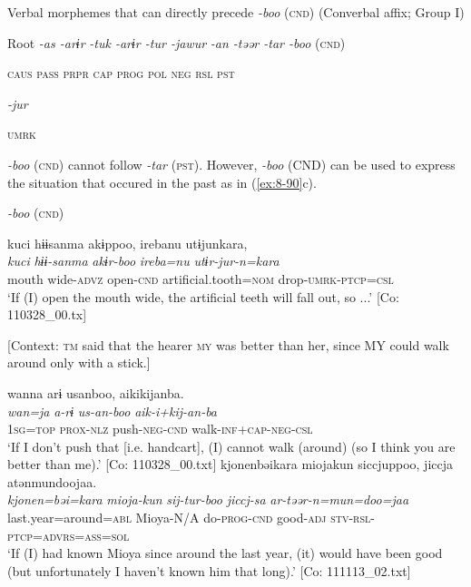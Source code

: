 \ea\label{ex:8-89}
  Verbal morphemes that can directly precede \textit{-boo} (\textsc{cnd}) (Converbal affix; Group I)

  Root  \textit{-as  -arɨr} %
\textit{-tuk  -arɨr  -tur  -jawur} %
\textit{-an  -təər  -tar  -boo} (\textsc{cnd})

    \textsc{caus}  \textsc{pass}  \textsc{prpr}  \textsc{cap}  \textsc{prog}  \textsc{pol}  \textsc{neg}  \textsc{rsl}  \textsc{pst}

          \textit{-jur}

          \textsc{umrk}
\z

\textit{-boo} (\textsc{cnd}) cannot follow \textit{-tar} (\textsc{pst}). However, \textit{-boo} (CND) can be used to express the situation that occured in the past as in (\ref{ex:8-90}c).

\ea\label{ex:8-90}
  \textit{-boo} (\textsc{cnd})

\ea
{\TM}
\glll  kuci  hɨɨsanma  akɨppoo,  {\textbar}ireba{\textbar}nu      utɨjunkara,\\
\textit{kuci}  \textit{hɨɨ-sanma}  \textit{akɨr-boo}  \textit{ireba=nu}      \textit{utɨr-jur-n=kara}\\
mouth  wide-\textsc{advz}  open-\textsc{cnd}  artificial.tooth=\textsc{nom}  drop-\textsc{umrk}-\textsc{ptcp}=\textsc{csl}\\
\glt ‘If (I) open the mouth wide, the artificial teeth will fall out, so ...’ [Co: 110328\_00.tx]


\ex {}[Context: \textsc{tm} said that the hearer \textsc{my} was better than her, since MY could walk around only with a stick.]

{\TM}
\glll  wanna  arɨ  usanboo,  aikikijanba.\\
\textit{wan=ja}  \textit{a-rɨ}  \textit{us-an-boo}  \textit{aik-i+kij-an-ba}\\
1\textsc{sg}=\textsc{top}  \textsc{prox}-\textsc{nlz}  push-\textsc{neg}-\textsc{cnd}  walk-\textsc{inf}+\textsc{cap}-\textsc{neg}-\textsc{csl}\\
\glt ‘If I don’t push that [i.e. handcart], (I) cannot walk (around) (so I think you are better than me).’ [Co: 110328\_00.txt]
\ex
{\TM}
\glll  {\textbar}kjonen{\textbar}bəikara  mioja{\textbar}kun{\textbar}  siccjuppoo,  jiccja      atənmundoojaa.\\
\textit{kjonen=bəi=kara}  \textit{mioja-kun}  \textit{sij-tur-boo}  \textit{jiccj-sa}    \textit{ar-təər-n=mun=doo=jaa}\\
last.year=around=\textsc{abl}  Mioya-N/A  do-\textsc{prog}-\textsc{cnd}  good-\textsc{adj}  \textsc{stv}-\textsc{rsl}-\textsc{ptcp}=\textsc{advrs}=\textsc{ass}=\textsc{sol}\\
\glt ‘If (I) had known Mioya since around the last year, (it) would have been good (but unfortunately I haven’t known him that long).’ [Co: 111113\_02.txt]

